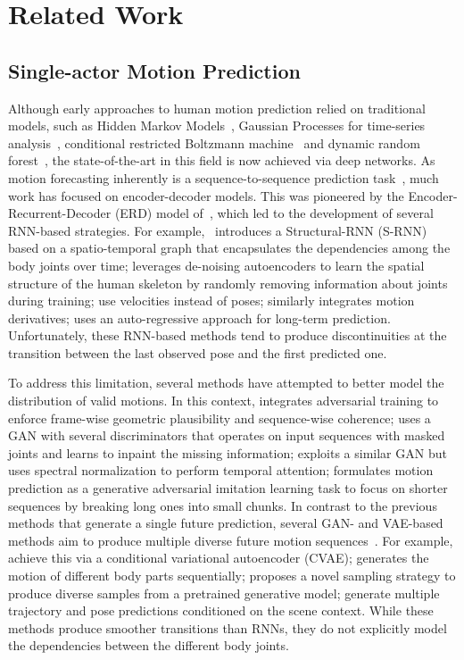 \section{Related Work}

\subsection{Single-actor Motion Prediction} Although early approaches to human motion prediction relied on traditional models, such as Hidden Markov Models~\cite{Brand00}, Gaussian Processes for time-series analysis~\cite{Wang05b}, conditional restricted Boltzmann machine~\cite{Taylor06} and dynamic random forest~\cite{Lehrmann14}, the state-of-the-art in this field is now achieved via deep networks.
As motion forecasting inherently is a sequence-to-sequence prediction task~\cite{Sutskever11,Sutskever14,Bahdanau15,Dutil17,Vaswani17}, much work has focused on encoder-decoder models. This was pioneered by the Encoder-Recurrent-Decoder (ERD) model of~\cite{Fragkiadaki15}, which led to the development of several RNN-based strategies. For example,~\cite{Jain16a} introduces a Structural-RNN (S-RNN) based on a spatio-temporal graph that encapsulates the dependencies among the body joints over time; \cite{Ghosh17} leverages de-noising autoencoders to learn the spatial structure of the human skeleton by randomly removing information about joints during training; \cite{Martinez17b,Chiu19b} use velocities instead of poses; \cite{Gopalakrishnan19} similarly integrates motion derivatives; \cite{Zhou18a} uses an auto-regressive approach for long-term prediction. Unfortunately, these RNN-based methods tend to produce discontinuities at the transition between the last observed pose and the first predicted one.

To address this limitation, several methods have attempted to better model the distribution of valid motions. In this context, \cite{Gui18a} integrates adversarial training to enforce frame-wise geometric plausibility and sequence-wise coherence; \cite{Ruiz19} uses a GAN with several discriminators that operates on input sequences with masked joints and learns to inpaint the missing information; \cite{Cui21} exploits a similar GAN but uses spectral normalization to perform temporal attention; \cite{Wang19h} formulates motion prediction as a generative adversarial imitation learning task to focus on shorter sequences by breaking long ones into small chunks. In contrast to the previous methods that generate a single future prediction, several GAN- and VAE-based methods aim to produce multiple diverse future motion sequences~\cite{Barsoum18,Yan18a,Kundu19,Yuan20,Aliakbarian20,Aliakbarian21,Mao21b}. For example, \cite{Aliakbarian20,Aliakbarian21} achieve this via a conditional variational autoencoder (CVAE); \cite{Mao21b} generates the motion of different body parts sequentially; \cite{Yuan20} proposes a novel sampling strategy to produce diverse samples from a pretrained generative model; \cite{Cao20,Wang21d} generate multiple trajectory and pose predictions conditioned on the scene context. While these methods produce smoother transitions than RNNs, they do not explicitly model the dependencies between the different body joints.

